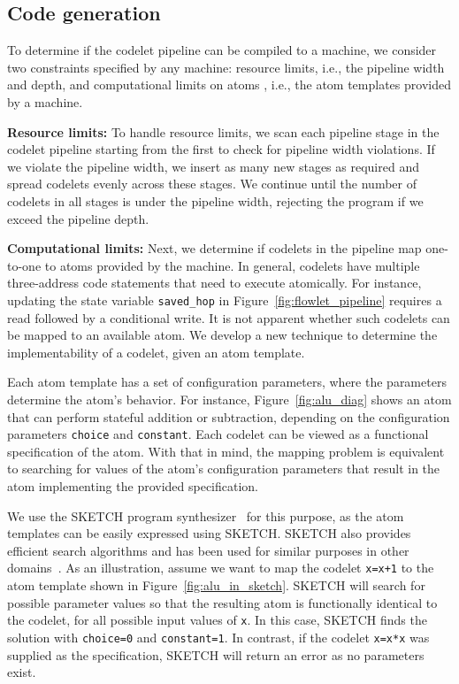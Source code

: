 \subsection{Code generation}
\label{ss:code_gen}

To determine if the codelet pipeline can be compiled to a \absmachine machine,
we consider two constraints specified by any \absmachine machine: resource
limits, i.e., the pipeline width and depth, and computational limits on atoms
, i.e., the atom templates provided by a \absmachine machine.

\textbf{Resource limits:} To handle resource limits, we scan each pipeline
stage in the codelet pipeline starting from the first to check for pipeline
width violations.  If we violate the pipeline width, we insert as many new
stages as required and spread codelets evenly across these stages.  We continue
until the number of codelets in all stages is under the pipeline width,
rejecting the program if we exceed the pipeline depth.

\textbf{Computational limits:} Next, we determine if codelets in the pipeline
map one-to-one to atoms provided by the \absmachine machine. In general,
codelets have multiple three-address code statements that need to execute
atomically. For instance, updating the state variable \texttt{saved\_hop} in
Figure~\ref{fig:flowlet_pipeline} requires a read followed by a conditional
write.  It is not apparent whether such codelets can be mapped to an available
atom. We develop a new technique to determine the implementability of a codelet,
given an atom template.

Each atom template has a set of configuration parameters, where the parameters
determine the atom's behavior.  For instance, Figure~\ref{fig:alu_diag} shows
an atom that can perform stateful addition or subtraction, depending on the
configuration parameters {\tt choice} and {\tt constant}.  Each codelet can be
viewed as a functional specification of the atom.  With that in mind, the
mapping problem is equivalent to searching for values of the atom's configuration
parameters that result in the atom implementing the provided specification.

We use the SKETCH program synthesizer~\cite{sketch_asplos} for this purpose, as
the atom templates can be easily expressed using SKETCH. SKETCH also
provides efficient search algorithms and has been used for similar purposes in
other domains~\cite{bitstreaming, chlorophyll}.  As an
illustration, assume we want to map the codelet {\tt x=x+1} to the atom
template shown in Figure~\ref{fig:alu_in_sketch}. SKETCH will search for
possible parameter values so that the resulting atom is functionally identical
to the codelet, for all possible input values of {\tt x}.  In this case, SKETCH
finds the solution with {\tt choice=0} and {\tt constant=1}.  In contrast, if
the codelet {\tt x=x*x} was supplied as the specification, SKETCH will return
an error as no parameters exist.

